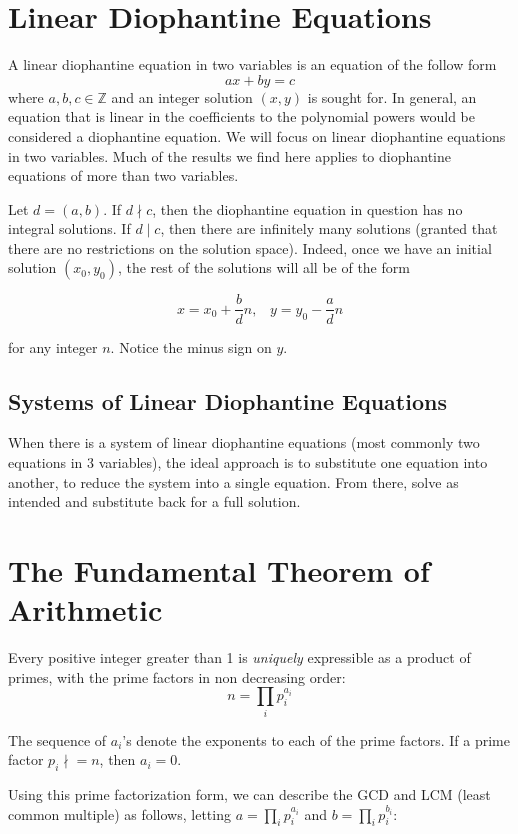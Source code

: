 \documentclass{article}
\begin{document}
\begin{multicols*}{2}
\section{Linear Diophantine Equations}

A linear diophantine equation in two variables is an equation of the follow form \[ax+by=c\] where $a,b,c \in \mathbb{Z}$ and an integer solution $(x,y)$ is sought for. In general, an equation that is linear in the coefficients to the polynomial powers would be considered a diophantine equation. We will focus on linear diophantine equations in two variables. Much of the results we find here applies to diophantine equations of more than two variables.

Let $d = (a, b)$. If $d \nmid c$, then the diophantine equation in question has no integral solutions. If $d \mid c$, then there are infinitely many solutions (granted that there are no restrictions on the solution space). Indeed, once we have an initial solution $(x_0, y_0)$, the rest of the solutions will all be of the form

\[x = x_0 + \frac{b}{d}n,\;\;\;y = y_0 - \frac{a}{d}n \]

for any integer $n$. Notice the minus sign on $y$.

\subsection*{Systems of Linear Diophantine Equations}

When there is a system of linear diophantine equations (most commonly two equations in 3 variables), the ideal approach is to substitute one equation into another, to reduce the system into a single equation. From there, solve as intended and substitute back for a full solution.

\section{The Fundamental Theorem of Arithmetic}

Every positive integer greater than 1 is \textit{uniquely} expressible as a product of primes, with the prime factors in non decreasing order: \[n = \prod_{i} p_i^{a_i}\]

The sequence of $a_i$'s denote the exponents to each of the prime factors. If a prime factor $p_i \nmid =n$, then $a_i = 0$.

Using this prime factorization form, we can describe the GCD and LCM (least common multiple) as follows, letting $a = \prod_{i}p_i^{a_i}$ and $b = \prod_{i}p_i^{b_i}$:


\end{multicols*}
\end{document}
